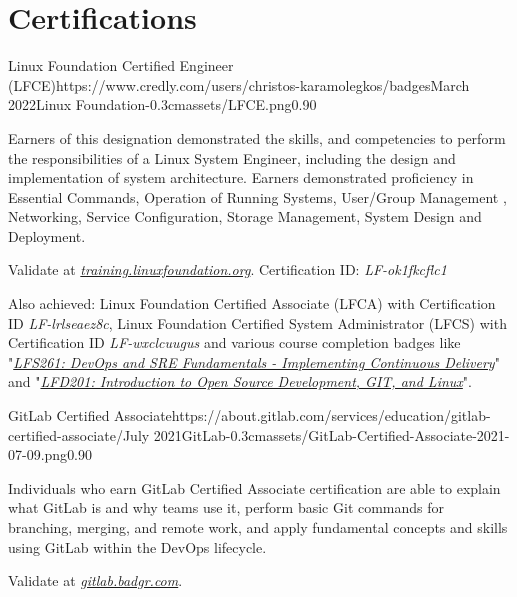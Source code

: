 \documentclass{mycv}
\begin{document}
	\section{Certifications}
    \begin{EntryDatedLogo}{Linux Foundation Certified Engineer (LFCE)}{https://www.credly.com/users/christos-karamolegkos/badges}{March 2022}{Linux Foundation}{-0.3cm}{assets/LFCE.png}{0.90}
    	\vspace{-0.2cm}
		\begin{Itemize}
			\item Earners of this designation demonstrated the skills, and competencies to perform the responsibilities of a Linux System Engineer, including the design and implementation of system architecture. Earners demonstrated proficiency in Essential Commands, Operation of Running Systems, User/Group Management , Networking, Service Configuration, Storage Management, System Design and Deployment.
			\item Validate at \href{https://training.linuxfoundation.org/certification/verify-linux-certifications}{\textit{training.linuxfoundation.org}}. Certification ID: \textit{LF-ok1fkcflc1}
			\item Also achieved: Linux Foundation Certified Associate (LFCA) with Certification ID \textit{LF-lrlseaez8c}, Linux Foundation Certified System Administrator (LFCS) with Certification ID \textit{LF-wxclcuugus} and various course completion badges like "\href{https://www.credly.com/badges/19ff66ca-2e10-4e1b-90a9-1c1ac6132878}{\textit{LFS261: DevOps and SRE Fundamentals - Implementing Continuous Delivery}}" and "\href{https://www.credly.com/badges/1fc7edfc-227e-4e93-ac46-297ab05c27db}{\textit{LFD201: Introduction to Open Source Development, GIT, and Linux}}".
		\end{Itemize}
	\end{EntryDatedLogo}

	\vspace{0.75cm}

    \begin{EntryDatedLogo}{GitLab Certified Associate}{https://about.gitlab.com/services/education/gitlab-certified-associate/}{July 2021}{GitLab}{-0.3cm}{assets/GitLab-Certified-Associate-2021-07-09.png}{0.90}
    	\vspace{-0.2cm}
		\begin{Itemize}
			\item Individuals who earn GitLab Certified Associate certification are able to explain what GitLab is and why teams use it, perform basic Git commands for branching, merging, and remote work, and apply fundamental concepts and skills using GitLab within the DevOps lifecycle.
			\item Validate at \href{https://gitlab.badgr.com/public/assertions/Hw6j8Th9SyKNj8ehsQkqAw}{\textit{gitlab.badgr.com}}.
		\end{Itemize}
	\end{EntryDatedLogo}
\end{document}

